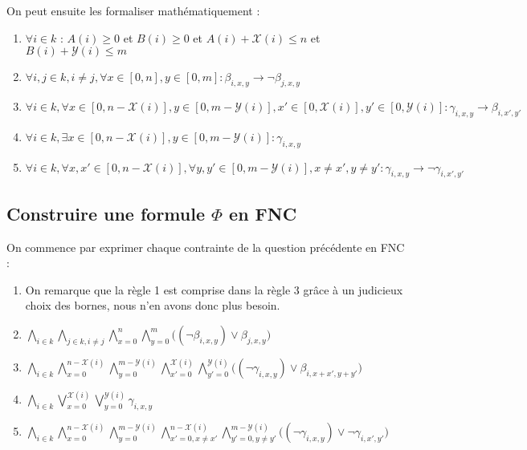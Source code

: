 \documentclass[a4paper]{article}
\begin{document}
On peut ensuite les formaliser mathématiquement :
\begin{enumerate}
  \item $\forall i \in k$ : $A(i) \geq 0$ et $B(i) \geq 0$ et $A(i) + \mathcal{X}(i) \leq n$ et $B(i) + \mathcal{Y}(i)\leq m$

  \item $\forall i,j \in k, i \neq j, \forall x \in [0,n], y \in [0,m] : \beta_{i, x, y} \rightarrow \lnot \beta_{j, x, y}$

  \item $
  \forall i \in k,
  \forall x \in [0, n - \mathcal{X}(i)] , y \in [0, m - \mathcal{Y}(i)],
    x' \in [0, \mathcal{X}(i)], y' \in [0, \mathcal{Y}(i)] : \gamma_{i, x, y} \rightarrow \beta_{i, x', y'}
  $

  \item $\forall i \in k, \exists x \in  [0, n - \mathcal{X}(i)], y \in [0, m - \mathcal{Y}(i)] : \gamma_{i, x, y}$

  \item $
  \forall i \in k,
  \forall x,x' \in [0, n - \mathcal{X}(i)],
  \forall y,y' \in [0, m - \mathcal{Y}(i)],
  x \neq x', y \neq y' :
  \gamma_{i, x, y} \rightarrow \lnot \gamma_{i, x', y'}
  $
\end{enumerate}

\subsection{Construire une formule $\Phi$ en FNC}
On commence par exprimer chaque contrainte de la question précédente en FNC :
\begin{enumerate}
  \item On remarque que la règle 1 est comprise dans la règle 3 grâce à un judicieux choix des bornes, nous n'en avons donc plus besoin.

  \item $
  \bigwedge_{i \in k} \bigwedge_{j \in k, i \neq j} \bigwedge_{x=0}^{n} \bigwedge_{y=0}^{m}
  \Big( (\lnot \beta_{i, x, y}) \lor \beta_{j, x, y} \Big)
  $

  \item $
  \bigwedge_{i \in k}
  \bigwedge_{x=0}^{n - \mathcal{X}(i)} \bigwedge_{y=0}^{m - \mathcal{Y}(i)}
  \bigwedge_{x'=0}^{\mathcal{X}(i)} \bigwedge_{y'=0}^{\mathcal{Y}(i)}
  \Big( (\lnot \gamma_{i, x, y}) \lor \beta_{i, x+x', y+y'} \Big)
  $

  \item $
  \bigwedge_{i \in k} \bigvee_{x=0}^{\mathcal{X}(i)} \bigvee_{y=0}^{\mathcal{Y}(i)} \gamma_{i, x, y}
  $

  \item $
  \bigwedge_{i \in k}
  \bigwedge_{x=0}^{n - \mathcal{X}(i)} \bigwedge_{y=0}^{m - \mathcal{Y}(i)}
  \bigwedge_{x'=0, x\neq x'}^{n - \mathcal{X}(i)} \bigwedge_{y'=0, y\neq y'}^{m - \mathcal{Y}(i)}
  \Big( (\lnot \gamma_{i, x, y}) \lor \lnot \gamma_{i, x', y'} \Big)
  $

\end{enumerate}
\vspace{1em}
\end{document}
